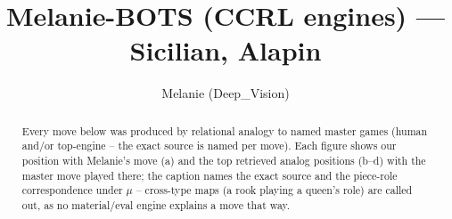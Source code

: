 \documentclass[11pt]{article}
\title{Melanie-BOTS (CCRL engines) — Sicilian, Alapin}
\author{Melanie (Deep\_Vision)}
\date{}
\begin{document}
\maketitle

\begin{abstract}Every move below was produced by relational analogy to named master games (human and/or top-engine -- the exact source is named per move). Each figure shows our position with Melanie's move (a) and the top retrieved analog positions (b--d) with the master move played there; the caption names the exact source and the piece-role correspondence under $\mu$ -- cross-type maps (a rook playing a queen's role) are called out, as no material/eval engine explains a move that way.\end{abstract}

\begin{figure}[p]\centering
\begin{subfigure}{0.46\textwidth}\centering
\resizebox{\linewidth}{!}{%
\newchessgame
\chessboard[
  setfen={r1bqkb1r/pp2pppp/2np4/3nP3/3P4/5N2/PP2KPPP/RNBQ1B1R b kq - 1 7},
  showmover=false,
  pgfstyle=straightmove, color=movearrow, markmove={d5-b6}
]}
\caption{}
\end{subfigure}\hfill
\begin{subfigure}{0.46\textwidth}\centering
\resizebox{\linewidth}{!}{%
\newchessgame
\chessboard[
  setfen={r1bqkb1r/ppp1pppp/2np4/3nP3/2PP4/5N2/PP3PPP/RNBQKB1R b KQkq - 0 5},
  showmover=false,
  pgfstyle=straightmove, color=movearrow, markmove={d5-b6}
]}
\caption{}
\end{subfigure}
\\[4pt]
\begin{subfigure}{0.46\textwidth}\centering
\resizebox{\linewidth}{!}{%
\newchessgame
\chessboard[
  setfen={r1bqkb1r/ppp1pppp/2np4/3nP3/2PP4/5N2/PP3PPP/RNBQKB1R b KQkq - 0 5},
  showmover=false,
  pgfstyle=straightmove, color=movearrow, markmove={d5-b6}
]}
\caption{}
\end{subfigure}\hfill
\begin{subfigure}{0.46\textwidth}\centering
\resizebox{\linewidth}{!}{%
\newchessgame
\chessboard[
  setfen={r1bqkb1r/pp2pppp/2np4/3nP3/2BP4/5N2/PP3PPP/RNBQK2R b KQkq - 3 7},
  showmover=false,
  pgfstyle=straightmove, color=movearrow, markmove={d5-b6}
]}
\caption{}
\end{subfigure}

\end{figure}
\end{document}
